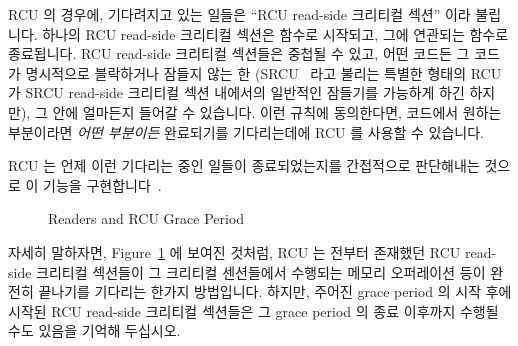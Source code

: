 RCU 의 경우에, 기다려지고 있는 일들은 ``RCU read-side 크리티컬 섹션'' 이라
불립니다.
하나의 RCU read-side 크리티컬 섹션은  함수로 시작되고, 그에
연관되는  함수로 종료됩니다.
RCU read-side 크리티컬 섹션들은 중첩될 수 있고, 어떤 코드든 그 코드가
명시적으로 블락하거나 잠들지 않는 한 (SRCU~\cite{PaulEMcKenney2006c} 라고
불리는 특별한 형태의 RCU 가 SRCU read-side 크리티컬 섹션 내에서의 일반적인
잠들기를 가능하게 하긴 하지만), 그 안에 얼마든지 들어갈 수 있습니다.
이런 규칙에 동의한다면, 코드에서 원하는 부분이라면 \emph{어떤 부분이든}
완료되기를 기다리는데에 RCU 를 사용할 수 있습니다.

RCU 는 언제 이런 기다리는 중인 일들이 종료되었는지를 간접적으로 판단해내는
것으로 이 기능을 구현합니다~\cite{PaulEMcKenney2007whatisRCU,
PaulEMcKenney2007PreemptibleRCU}.

\begin{figure}[tb]
\begin{center}
\end{center}
\caption{Readers and RCU Grace Period}
\label{fig:defer:Readers and RCU Grace Period}
\end{figure}

자세히 말하자면,
Figure~\ref{fig:defer:Readers and RCU Grace Period} 에 보여진 것처럼, RCU 는
전부터 존재했던 RCU read-side 크리티컬 섹션들이 그 크리티컬 센션들에서 수행되는
메모리 오퍼레이션 등이 완전히 끝나기를 기다리는 한가지 방법입니다.
하지만, 주어진 grace period 의 시작 후에 시작된 RCU read-side 크리티컬 섹션들은
그 grace period 의 종료 이후까지 수행될 수도 있음을 기억해 두십시오.

